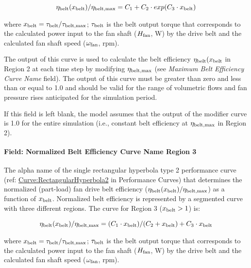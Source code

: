 \begin{equation}
  \eta_{\rm{belt}} (x_{\rm{belt}}) / \eta_{\rm{belt, max}} = C_1 + C_2 \cdot exp(C_3 \cdot x_{\rm{belt}})
\end{equation}

where \(x_{\rm{belt}} = \tau_{\rm{belt}} / \tau_{\rm{belt, max}}\); \(\tau_{\rm{belt}}\) is the belt output torque that corresponds to the calculated power input to the fan shaft (\(H_{\rm{fan}}\), W) by the drive belt and the calculated fan shaft speed (\(\omega_{\rm{fan}}\), rpm).

The output of this curve is used to calculate the belt efficiency \(\eta_{\rm{belt}} (x_{\rm{belt}}\) in Region 2 at each time step by modifying \(\eta_{\rm{belt, max}}\) (see \emph{Maximum Belt Efficiency Curve Name} field). The output of this curve must be greater than zero and less than or equal to 1.0 and should be valid for the range of volumetric flows and fan pressure rises anticipated for the simulation period.

If this field is left blank, the model assumes that the output of the modifier curve is 1.0 for the entire simulation (i.e., constant belt efficiency at \(\eta_{\rm{belt, max}}\) in Region 2).

\paragraph{Field: Normalized Belt Efficiency Curve Name Region 3}\label{field-normalized-belt-efficiency-curve-name-region-3}

The alpha name of the single rectangular hyperbola type 2 performance curve (ref: \hyperref[curverectangularhyperbola2]{Curve:RectangularHyperbola2} in Performance Curves) that determines the normalized (part-load) fan drive belt efficiency (\(\eta_{\rm{belt}} (x_{\rm{belt}}) / \eta_{\rm{belt, max}}\)) as a function of \(x_{\rm{belt}}\). Normalized belt efficiency is represented by a segmented curve with three different regions. The curve for Region 3 (\(x_{\rm{belt}} > 1\)) is:

\begin{equation}
  \eta_{\rm{belt}} ( x_{\rm{belt}} ) / \eta_{\rm{belt, max}} = ( C_1 \cdot x_{\rm{belt}} ) / ( C_2 + x_{\rm{belt}} ) + C_3 \cdot x_{\rm{belt}}
\end{equation}

where \(x_{\rm{belt}} = \tau_{\rm{belt}} / \tau_{\rm{belt, max}}\); \(\tau_{\rm{belt}}\) is the belt output torque that corresponds to the calculated power input to the fan shaft (\(H_{\rm{fan}}\), W) by the drive belt and the calculated fan shaft speed (\(\omega_{\rm{fan}}\), rpm).

